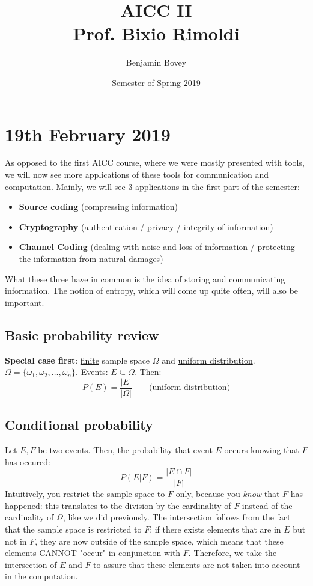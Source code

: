 \documentclass{article}
\title{AICC II \\ Prof. Bixio Rimoldi}
\author{Benjamin Bovey}
\date{Semester of Spring 2019}
\begin{document}
\maketitle


\section{19th February 2019}
As opposed to the first AICC course, where we were mostly presented with tools, we will now see more applications of these tools for communication and computation. Mainly, we will see 3 applications in the first part of the semester:
\begin{itemize}
	\item \textbf{Source coding} (compressing information)
	\item \textbf{Cryptography} (authentication / privacy / integrity of information)
	\item \textbf{Channel Coding} (dealing with noise and loss of information / protecting the information from natural damages)
\end{itemize}
What these three have in common is the idea of storing and communicating information. The notion of entropy, which will come up quite often, will also be important.

\subsection{Basic probability review}
\textbf{Special case first}: \underline{finite} sample space $\Omega$ and \underline{uniform distribution}. $\Omega = \{\omega_1, \omega_2, \dots, \omega_n\}$. Events: $E \subseteq \Omega$. Then:
\begin{equation}
	P(E) = \dfrac{|E|}{|\Omega|} \qquad \text{(uniform distribution)}
\end{equation}

\subsection{Conditional probability}
Let $E, F$ be two events. Then, the probability that event $E$ occurs knowing that $F$ has occured:
\begin{equation}
	P(E|F) = \dfrac{|E \cap F|}{|F|}
\end{equation}
Intuitively, you restrict the sample space to $F$ only, because you \emph{know} that $F$ has happened: this translates to the division by the cardinality of $F$ instead of the cardinality of $\Omega$, like we did previously. The intersection follows from the fact that the sample space is restricted to $F$: if there exists elements that are in $E$ but not in $F$, they are now outside of the sample space, which means that these elements CANNOT "occur" in conjunction with $F$. Therefore, we take the intersection of $E$ and $F$ to assure that these elements are not taken into account in the computation.
\end{document}
